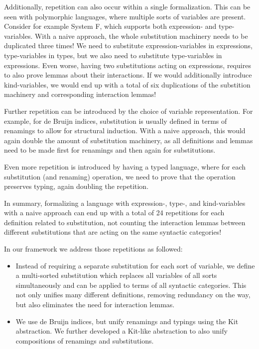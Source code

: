 \documentclass[sigplan,10pt, anonymous]{acmart}
\begin{document}
  Additionally, repetition can also occur within a single formalization.
  This can be seen with polymorphic languages, where multiple sorts
  of variables are present.
  Consider for example System F, which supports both expression- and
  type-variables.
  With a naive approach, the whole substitution machinery needs to be
  duplicated three times! We need to substitute expression-variables in
  expressions, type-variables in types, but we also need to substitute
  type-variables in expressions.
  Even worse, having two substitutions acting on expressions, requires
  to also prove lemmas about their interactions.
  If we would additionally introduce kind-variables, we would end up
  with a total of six duplications of the substition machinery and
  corresponding interaction lemmas!
  
  Further repetition can be introduced by the choice of variable
  representation. For example, for de Bruijn indices, substitution is
  usually defined in terms of renamings to allow for structural
  induction.
  With a naive approach, this would again double the amount of
  substitution machinery, as all definitions and lemmas need to be
  made first for renamings and then again for substitutions.

  Even more repetition is introduced by having a typed language,
  where for each substitution (and renaming) operation, we need to prove
  that the operation preserves typing, again doubling the repetition.

  In summary, formalizing a language with expression-, type-, and
  kind-variables with a naive approach can end up with a total of 24
  repetitions for each definition related to substitution, not counting
  the interaction lemmas between different substitutions that are
  acting on the same syntactic categories!

  In our framework we address those repetitions as followed:
  \begin{itemize}
  \item
    Instead of requiring a separate substitution for each sort of variable,
    we define a multi-sorted substitution which replaces all variables
    of all sorts simultaneously and can be applied to terms of all syntactic categories.
    This not only unifies many different definitions, removing redundancy on the way,
    but also eliminates the need for interaction lemmas.
  \item
    We use de Bruijn indices, but unify renamings and typings using the Kit abstraction.
    We further developed a Kit-like abstraction to also unify
    compositions of renamings and substitutions.
  \end{itemize}
  
\end{document}
